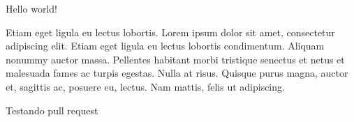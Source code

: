 \documentclass[11pt,a4paper,oneside]{article}
\begin{document}
Hello world!


Etiam eget ligula eu lectus lobortis. Lorem ipsum dolor sit amet, consectetur adipiscing elit. Etiam eget ligula eu lectus lobortis condimentum. Aliquam nonummy auctor massa. Pellentes habitant morbi tristique senectus et netus et malesuada fames ac turpis egestas. Nulla at risus. Quisque purus magna, auctor et, sagittis ac, posuere eu, lectus. Nam mattis, felis ut adipiscing.

Testando pull request
\end{document}
